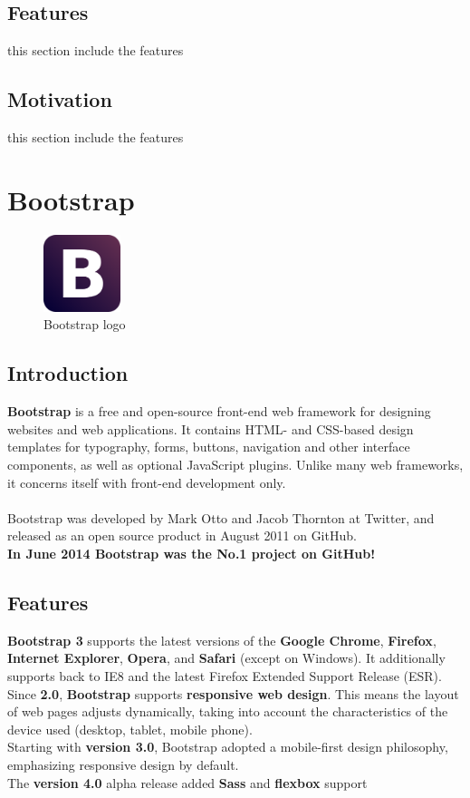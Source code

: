 \documentclass[12pt]{article}
\begin{document}
	
	\subsection{Features}
	this section include the features
	\subsection{Motivation}
	this section include the features
	
	\section{Bootstrap}
	\begin{figure}[h]
		\centering
		\includegraphics[width=0.20\textwidth]{Boostrap_logo.png}
		\caption{Bootstrap logo}
	\end{figure}
	\subsection{Introduction}
	\textbf{Bootstrap} is a free and open-source front-end web framework for designing websites and web applications. It contains HTML- and CSS-based design templates for typography, forms, buttons, navigation and other interface components, as well as optional JavaScript plugins. Unlike many web frameworks, it concerns itself with front-end development only.
	\\
	\\
	Bootstrap was developed by Mark Otto and Jacob Thornton at Twitter, and released as an open source product in August 2011 on GitHub.\\
	\textbf{In June 2014 Bootstrap was the No.1 project on GitHub!}
	\subsection{Features}
	\textbf{Bootstrap 3} supports the latest versions of the \textbf{Google Chrome}, \textbf{Firefox}, \textbf{Internet Explorer}, \textbf{Opera}, and \textbf{Safari} (except on Windows). It additionally supports back to IE8 and the latest Firefox Extended Support Release (ESR).
	\\
	Since \textbf{2.0}, \textbf{Bootstrap} supports \textbf{responsive web design}. This means the layout of web pages adjusts dynamically, taking into account the characteristics of the device used (desktop, tablet, mobile phone).
	\\
	Starting with \textbf{version 3.0}, Bootstrap adopted a mobile-first design philosophy, emphasizing responsive design by default.
	\\
	The \textbf{version 4.0} alpha release added \textbf{Sass} and \textbf{flexbox} support
\end{document}
